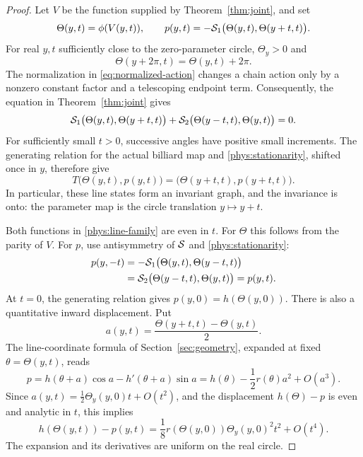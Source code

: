 \begin{proof}
Let \(V\) be the function supplied by Theorem~\ref{thm:joint}, and set
\begin{equation}\label{phys:line-family}
 \Theta(y,t)=\phi(V(y,t)),\qquad
 p(y,t)=-\mathcal{S}_1\bigl(\Theta(y,t),\Theta(y+t,t)\bigr).
\end{equation}
For real \(y,t\) sufficiently close to the zero-parameter circle,
\(\Theta_y>0\) and
\[
 \Theta(y+2\pi,t)=\Theta(y,t)+2\pi.
\]
The normalization in \eqref{eq:normalized-action} changes a chain action
only by a nonzero constant factor and a telescoping endpoint term.
Consequently, the equation in Theorem~\ref{thm:joint} gives
\begin{equation}\label{phys:stationarity}
 \mathcal{S}_1\bigl(\Theta(y,t),\Theta(y+t,t)\bigr)
 +\mathcal{S}_2\bigl(\Theta(y-t,t),\Theta(y,t)\bigr)=0.
\end{equation}
For sufficiently small \(t>0\), successive angles have positive small
increments. The generating relation for the actual billiard map and
\eqref{phys:stationarity}, shifted once in \(y\), therefore give
\begin{equation}\label{phys:invariance}
 T\bigl(\Theta(y,t),p(y,t)\bigr)
   =\bigl(\Theta(y+t,t),p(y+t,t)\bigr).
\end{equation}
In particular, these line states form an invariant graph, and the
invariance is onto: the parameter map is the circle translation
\(y\mapsto y+t\).

Both functions in \eqref{phys:line-family} are even in \(t\).
For \(\Theta\) this follows from the parity of \(V\). For \(p\), use
antisymmetry of \(\mathcal{S}\) and \eqref{phys:stationarity}:
\begin{align*}
 p(y,-t)
 &=-\mathcal{S}_1\bigl(\Theta(y,t),\Theta(y-t,t)\bigr)\\
 &=\mathcal{S}_2\bigl(\Theta(y-t,t),\Theta(y,t)\bigr)
 =p(y,t).
\end{align*}
At \(t=0\), the generating relation gives \(p(y,0)=h(\Theta(y,0))\).
There is also a quantitative inward displacement. Put
\[
 a(y,t)=\frac{\Theta(y+t,t)-\Theta(y,t)}2.
\]
The line-coordinate formula of Section~\ref{sec:geometry}, expanded
at fixed \(\theta=\Theta(y,t)\), reads
\[
 p=h(\theta+a)\cos a-h'(\theta+a)\sin a
   =h(\theta)-\frac12r(\theta)a^2+O(a^3).
\]
Since \(a(y,t)=\frac12\Theta_y(y,0)t+O(t^2)\), and the displacement
\(h(\Theta)-p\) is even and analytic in \(t\), this implies
\begin{equation}\label{phys:inward-expansion}
 h(\Theta(y,t))-p(y,t)
 =\frac18r(\Theta(y,0))\Theta_y(y,0)^2t^2+O(t^4).
\end{equation}
The expansion and its derivatives are uniform on the real circle.


\end{proof}
